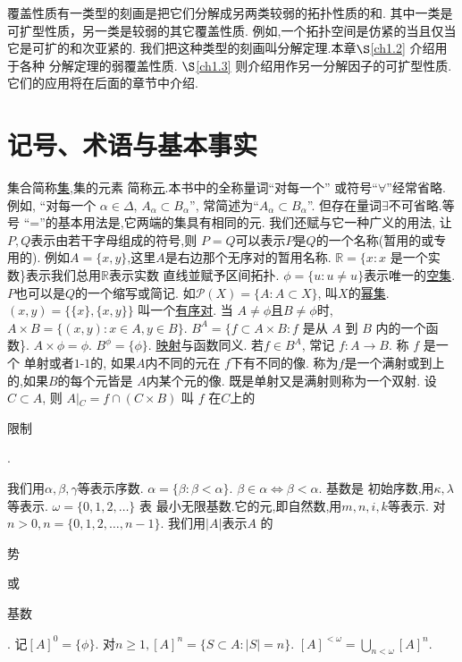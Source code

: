 \documentclass[main.tex]{subfiles}
\begin{document}
	
覆盖性质有一类型的刻画是把它们分解成另两类较弱的拓扑性质的和.
其中一类是可扩型性质，另一类是较弱的其它覆盖性质.
例如,一个拓扑空间是仿紧的当且仅当它是可扩的和次亚紧的.
我们把这种类型的刻画叫分解定理.本章$\S$\ref{ch1.2} 介绍用于各种
分解定理的弱覆盖性质. $\S$\ref{ch1.3} 则介绍用作另一分解因子的可扩型性质.
它们的应用将在后面的章节中介绍.
	
\section{记号、术语与基本事实}\label{ch1.1}
集合简称\underline{集},集的元素
简称\underline{元}.本书中的全称量词“对每一个”
或符号“$\forall$”经常省略.例如, “对每一个
$\alpha\in\Delta$, $A_\alpha \subset B_\alpha$”,
常简述为“$A_\alpha \subset B_\alpha$”.
但存在量词$\exists$不可省略.等号
“=”的基本用法是,它两端的集具有相同的元.
我们还赋与它一种广义的用法, 让$P, Q$表示由若干字母组成的符号,则
$P=Q$可以表示$P$是$Q$的一个名称(暂用的或专用的).
例如$A=\{x,y\}$,这里$A$是右边那个无序对的暂用名称.
$\mathbb{R} = \{x: x$ 是一个实数\}表示我们总用$\mathbb{R}$表示实数
直线並赋予区间拓扑.
$\phi=\{u: u\ne u\}$表示唯一的\underline{空集}.
$P$也可以是$Q$的一个缩写或简记. 如$\mathscr{P}(X)=\{A:A\subset X\}$, 
叫$X$的\underline{幂集}.
$(x, y) = \{ \{x\}, \{x, y\}\}$ 叫一个\underline{有序对}. 
当 $A\ne \phi$且$B\ne \phi$时, $A\times B = \{(x, y): x\in A, y\in B\}$.
$B^A = \{f\subset A\times B: f$ 是从 $A$ 到 $B$ 内的一个函数\}.
$A\times \phi = \phi$. $B^\phi = \{\phi\}$.
\underline{映射}与函数同义.  若$f\in B^A$, 常记 $f: A\to B$. 称 $f$ 是一个
单射或者$1$-$1$的, 如果$A$内不同的元在  $f$下有不同的像.
称为$f$是一个满射或到上的,如果$B$的每个元皆是
$A$内某个元的像. 既是单射又是满射则称为一个双射.
设$C\subset A$, 则 $A\vert{}_C = f\cap (C\times B)$ 叫 $f$
在$C$上的\begin{kaishu}限制\end{kaishu}.

我们用$\alpha, \beta, \gamma$等表示序数. $\alpha = \{\beta: \beta < \alpha\}$. $\beta \in \alpha \Leftrightarrow\beta<\alpha$. 基数是
初始序数,用$\kappa,\lambda$ 等表示. $\omega = \{0, 1, 2, \dots\}$ 表
最小无限基数.它的元,即自然数,用$m, n, i , k$等表示.
对$n>0, n = \{0,1,2, \dots, n-1\}$. 我们用$|A|$表示$A$ 
的\begin{kaishu}势\end{kaishu}或\begin{kaishu}基数\end{kaishu}.
记$[A]^0=\{\phi\}$. 对$n\ge1, [A]^n = \{S\subset A: |S| = n\}$.
$[A]^{<\omega} = \bigcup_{n<\omega}[A]^n$.
\end{document}
